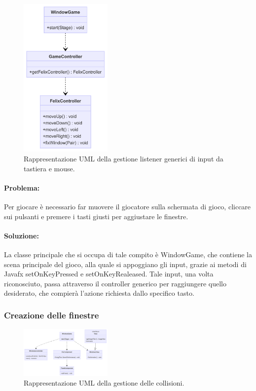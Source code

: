 \documentclass[a4paper,12pt]{report}
\begin{document}
\begin{figure}[H]
\centering{}
\includegraphics[width=0.4\textwidth]{img/input.png}
\caption{Rappresentazione UML della gestione listener generici di input da tastiera e mouse.}
\end{figure}

\paragraph{Problema:}
Per giocare è necessario far muovere il giocatore sulla schermata di gioco, cliccare sui pulsanti e premere i tasti giusti per aggiustare le finestre.

\paragraph{Soluzione:}
La classe principale che si occupa di tale compito è WindowGame, che contiene la scena principale del gioco, alla quale si appoggiano gli input, grazie ai metodi di Javafx setOnKeyPressed e setOnKeyRealeased.
Tale input, una volta riconosciuto, passa attraverso il controller generico per raggiungere quello desiderato, che compierà l'azione richiesta dallo specifico tasto.

\subsubsection{Creazione delle finestre}

\begin{figure}[H]
\centering{}
\includegraphics[width=0.4\textwidth]{img/windows.png}
\caption{Rappresentazione UML della gestione delle collisioni.}
\end{figure}
\end{document}
